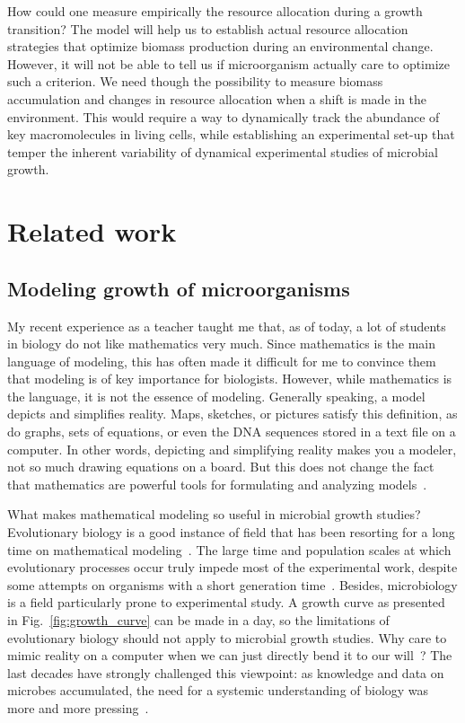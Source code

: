 How could one measure empirically the resource allocation during a growth transition?
The model will help us to establish actual resource allocation strategies that optimize biomass production during an environmental change.
However, it will not be able to tell us if microorganism actually care to optimize such a criterion.
We need though the possibility to measure biomass accumulation and changes in resource allocation when a shift is made in the environment.
This would require a way to dynamically track the abundance of key macromolecules in living cells, while establishing an experimental set-up that temper the inherent variability of dynamical experimental studies of microbial growth.

\section{Related work}

\subsection{Modeling growth of microorganisms}

My recent experience as a teacher taught me that, as of today, a lot of students in biology do not like mathematics very much.
Since mathematics is the main language of modeling, this has often made it difficult for me to convince them that modeling is of key importance for biologists.
However, while mathematics is the language, it is not the essence of modeling.
Generally speaking, a model depicts and simplifies reality.
Maps, sketches, or pictures satisfy this definition, as do graphs, sets of equations, or even the DNA sequences stored in a text file on a computer.
In other words, depicting and simplifying reality makes you a modeler, not so much drawing equations on a board.
But this does not change the fact that mathematics are powerful tools for formulating and analyzing models~\cite{servedio_not_2014,mcgill_calm_2013}.

What makes mathematical modeling so useful in microbial growth studies?
Evolutionary biology is a good instance of field that has been resorting for a long time on mathematical modeling~\cite{servedio_not_2014}.
The large time and population scales at which evolutionary processes occur truly impede most of the experimental work, despite some attempts on organisms with a short generation time~\cite{elena_evolution_2003}.
Besides, microbiology is a field particularly prone to experimental study.
A growth curve as presented in Fig.~\ref{fig:growth_curve} can be made in a day, so the limitations of evolutionary biology should not apply to microbial growth studies.
Why care to mimic reality on a computer when we can just directly bend it to our will~\cite{hillis_why_1993}?
The last decades have strongly challenged this viewpoint: as knowledge and data on microbes accumulated, the need for a systemic understanding of biology was more and more pressing~\cite{alon_introduction_2006,kremling_systems_2013}.

